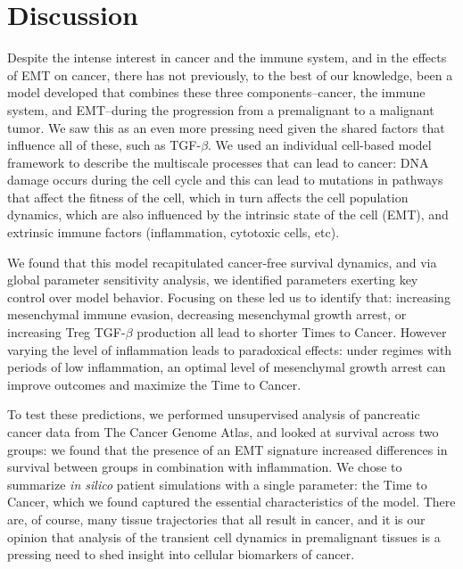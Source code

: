 \documentclass[11pt]{article}
\begin{document}
\section{Discussion}\label{Discussion}
Despite the intense interest in cancer and the immune system, and in the effects of EMT on cancer, there has not previously, to the best of our knowledge, been a model developed that combines these three components--cancer, the immune system, and EMT--during the progression from a premalignant to a malignant tumor. We saw this as an even more pressing need given the shared factors that influence all of these, such as TGF-$\beta$. We used an individual cell-based model framework to describe the multiscale processes that can lead to cancer: DNA damage occurs during the cell cycle and this can lead to mutations in pathways that affect the fitness of the cell, which in turn affects the cell population dynamics, which are also influenced by the intrinsic state of the cell (EMT), and extrinsic immune factors (inflammation, cytotoxic cells, etc).
\par
We found that this model recapitulated cancer-free survival dynamics, and via global parameter sensitivity analysis, we identified parameters exerting key control over model behavior. Focusing on these led us to identify that: increasing mesenchymal immune evasion, decreasing mesenchymal growth arrest, or increasing Treg TGF-$\beta$ production all lead to shorter Times to Cancer. However varying the level of inflammation leads to paradoxical effects: under regimes with periods of low inflammation, an optimal level of mesenchymal growth arrest can improve outcomes and maximize the Time to Cancer.
\par
To test these predictions, we performed unsupervised analysis of pancreatic cancer data from The Cancer Genome Atlas, and looked at survival across two groups: we found that the presence of an EMT signature increased differences in survival between groups in combination with inflammation. We chose to summarize {\em in silico} patient simulations with a single parameter: the Time to Cancer, which we found captured the essential characteristics of the model. There are, of course, many tissue trajectories that all result in cancer, and it is our opinion that analysis of the transient cell dynamics in premalignant tissues is a pressing need to shed insight into cellular biomarkers of cancer.
\par
\end{document}
